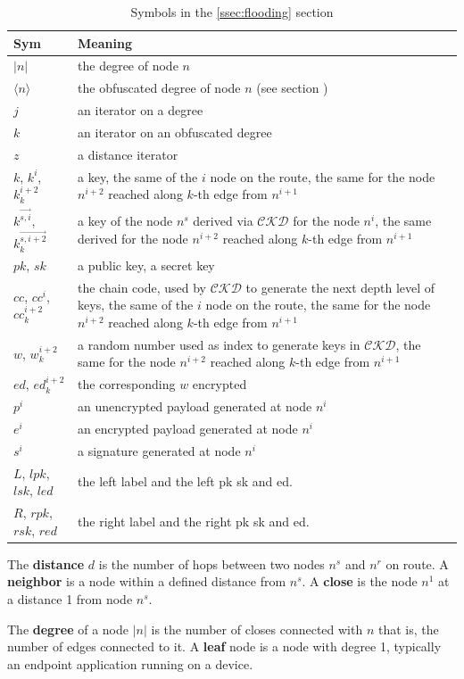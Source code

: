 \documentclass[12pt,oneside]{wlscirep}
\DeclareRobustCommand{\degree}[1]{{\lvert{#1}\rvert}}
\DeclareRobustCommand{\odegree}[1]{{\langle{#1}\rangle}}
\DeclareRobustCommand{\kder}[1]{{\overrightarrow{{#1}}}}
\begin{document}
\begin{table}[ht]
\begin{tabular}{@{}lp{13cm}@{}}
\toprule
Sym     & Meaning  \\ \midrule
$\degree{n}$ & the degree of node $n$  \\
$\odegree{n}$ & the obfuscated degree of node $n$ (see section )\\
$j$ & an iterator on a degree  \\
$k$ & an iterator on an obfuscated degree  \\
$z$ & a distance iterator \\
$k$, $k^i$, $k^{i+2}_k$ & a key, the same of the $i$ node on the route, the same for the node $n^{i+2}$ reached along $k$-th edge from $n^{i+1}$ \\
$k^\kder{s, i}$, $k_k^\kder{s, i+2}$ & a key of the node $n^s$ derived via $\mathcal{CKD}$ for the node $n^i$, the same derived for the node $n^{i+2}$ reached along $k$-th edge from $n^{i+1}$ \\
$pk$, $sk$  & a public key, a secret key\\
$cc$, $cc^i$, $cc^{i+2}_k$  & the chain code, used by $\mathcal{CKD}$ to generate the next depth level of keys, the same of the $i$ node on the route, the same for the node $n^{i+2}$ reached along $k$-th edge from $n^{i+1}$\\

$w$, $w^{i+2}_k$ & a random number used as index to generate keys in $\mathcal{CKD}$, the same for the node $n^{i+2}$ reached along $k$-th edge from $n^{i+1}$ \\
$ed$, $ed^{i+2}_k$ & the corresponding $w$ encrypted \\
$p^i$ & an unencrypted payload generated at node $n^i$ \\
$e^i$ & an encrypted payload generated at node $n^i$ \\
$s^i$ & a signature generated at node $n^i$ \\
$L$, $lpk$, $lsk$, $led$ & the left label and the left pk sk and ed. \\
$R$, $rpk$, $rsk$, $red$ & the right label and the right pk sk and ed. \\
\bottomrule
\end{tabular}
\caption{Symbols in the \ref{ssec:flooding} section}
\label{AlgorithmSymbols}
\end{table}
The \textbf{distance} $d$ is the number of hops between two nodes $n^s$ and $n^r$ on route. A \textbf{neighbor} is a node within a defined distance from $n^s$. A \textbf{close} is the node $n^1$ at a distance 1 from node $n^s$. \par
The \textbf{degree} of a node $\degree{n}$ is the number of closes connected with $n$ that is, the number of edges connected to it. A \textbf{leaf} node is a node with degree 1, typically an endpoint application running on a device. \par
\end{document}
